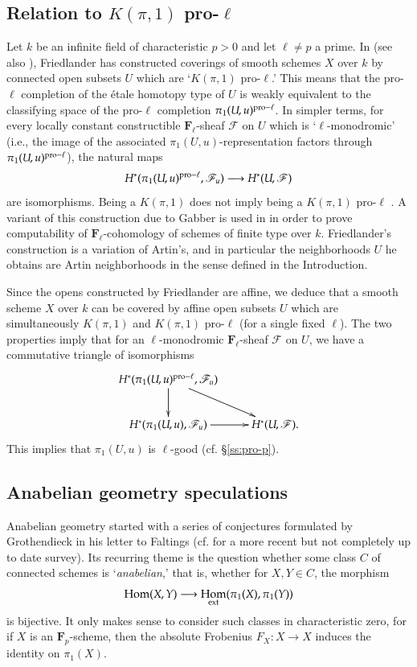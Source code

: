 \documentclass[twoside]{amsart}
\newcommand{\FF}{\mathbf{F}}
\newcommand{\Ff}{\mathscr{F}}
\DeclareMathOperator{\Hom}{Hom}
\renewcommand{\to}{\longrightarrow}
\theoremstyle{plain}
\theoremstyle{definition}
\theoremstyle{remark}
\numberwithin{equation}{subsection}
\begin{document}
\subsection{\texorpdfstring{Relation to $K(\pi, 1)$ pro-$\ell$}{Relation to K(pi, 1) pro-ell}} 
\label{ss:kpi1-pro-ell}

Let $k$ be an infinite field of characteristic $p>0$ and let $\ell\neq p$ a prime. In \cite{FriedlanderKpi1} (see also \cite[Theorem~7.11]{Friedlander}), Friedlander has constructed coverings of smooth schemes $X$ over $k$ by connected open subsets $U$ which are `$K(\pi, 1)$ pro-$\ell$.' This means that the pro-$\ell$ completion of the \'etale homotopy type of $U$ is weakly equivalent to the classifying space of the pro-$\ell$ completion $\pi_1(U,u)^{{\rm pro}-\ell}$. In simpler terms, for every locally constant constructible $\FF_\ell$-sheaf $\Ff$ on $U$ which is `$\ell$-monodromic' (i.e., the image of the associated $\pi_1(U,u)$-representation factors through $\pi_1(U,u)^{{\rm pro}-\ell}$), the natural maps
\[ 
	H^*(\pi_1(U,u)^{{\rm pro}-\ell}, \Ff_u) \to H^*(U, \Ff)
\]
are isomorphisms. Being a $K(\pi, 1)$ does not imply being a $K(\pi, 1)$ pro-$\ell$ \cite[Mise en garde 1.4.5]{MadoreOrgogozo}. A variant of this construction due to Gabber is used in \cite{MadoreOrgogozo} in order to prove computability of $\FF_\ell$-cohomology of schemes of finite type over $k$. Friedlander's construction is a variation of Artin's, and in particular the neighborhoods $U$ he obtains are Artin neighborhoods in the sense defined in the Introduction. 

Since the opens constructed by Friedlander are affine, we deduce that a smooth scheme $X$ over $k$ can be covered by affine open subsets $U$ which are simultaneously $K(\pi, 1)$ and $K(\pi, 1)$ pro-$\ell$ (for a single fixed $\ell$). The two properties imply that for an $\ell$-monodromic $\FF_\ell$-sheaf $\Ff$ on $U$, we have a commutative triangle of isomorphisms
\[ 
	\xymatrix{
		H^*(\pi_1(U, u)^{{\rm pro}-\ell}, \Ff_u) \ar[d] \ar[dr] & \\
		H^*(\pi_1(U, u), \Ff_u) \ar[r]  & H^*(U, \Ff).
	}
\]
This implies that $\pi_1(U, u)$ is $\ell$-good (cf. \S\ref{ss:pro-p}).

\subsection{Anabelian geometry speculations}
\label{ss:anabelian-geometry}

Anabelian geometry started with a series of conjectures formulated by Grothendieck in his letter to Faltings \cite{GrothendieckLetter} (cf. \cite[\S 5]{Szamuely} for a more recent but not completely up to date survey). Its recurring theme is the question whether some class $C$ of connected schemes is `\emph{anabelian},' that is, whether for $X, Y\in C$, the morphism
\[ 
	\Hom(X, Y) \to \Hom_{\rm ext}(\pi_1(X), \pi_1(Y))
\]
is bijective. It only makes sense to consider such classes in characteristic zero, for if $X$ is an $\FF_p$-scheme, then the absolute Frobenius $F_X\colon X\to X$ induces the identity on $\pi_1(X)$. 
\end{document}
